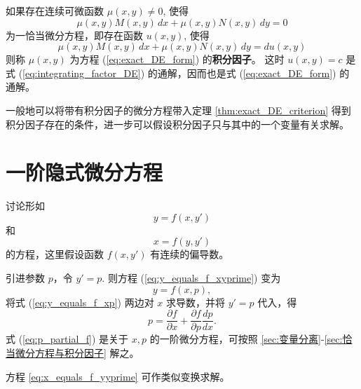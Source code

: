 \begin{definition}[积分因子]\label{def:积分因子}
    如果存在连续可微函数 $\mu(x,y) \ne 0$, 使得
\begin{equation}
\mu(x,y)M(x,y)\,dx+\mu(x,y)N(x,y)\,dy=0 \label{eq:integrating_factor_DE}
\end{equation}
为一恰当微分方程，即存在函数 $u(x,y)$, 使得
$$\mu(x,y)M(x,y)\,dx+\mu(x,y)N(x,y)\,dy=du(x,y)$$
则称 $\mu(x,y)$ 为方程 (\ref{eq:exact_DE_form}) 的\textbf{积分因子}。
这时 $u(x,y)=c$ 是式 (\ref{eq:integrating_factor_DE}) 的通解，因而也是式 (\ref{eq:exact_DE_form}) 的通解。
\end{definition}
\begin{remark}
    一般地可以将带有积分因子的微分方程带入定理 \ref{thm:exact_DE_criterion} 得到积分因子存在的条件，进一步可以假设积分因子只与其中的一个变量有关求解。
\end{remark}

\section{一阶隐式微分方程}\label{sec:一阶隐式微分方程}
\begin{example}
    讨论形如
\begin{equation}
y=f(x,y') \label{eq:y_equals_f_xyprime}
\end{equation}
和
\begin{equation}
x=f(y,y') \label{eq:x_equals_f_yyprime}
\end{equation}的方程，这里假设函数 $f(x,y')$ 有连续的偏导数。
\end{example}
\begin{solution}
    引进参数 $p$，令 $y'=p$. 则方程 (\ref{eq:y_equals_f_xyprime}) 变为
\begin{equation}
y=f(x,p), \label{eq:y_equals_f_xp}
\end{equation}
将式 (\ref{eq:y_equals_f_xp}) 两边对 $x$ 求导数，并将 $y'=p$ 代入，得
\begin{equation}
p = \frac{\partial f}{\partial x} + \frac{\partial f}{\partial p}\frac{dp}{dx}. \label{eq:p_partial_f}
\end{equation}
式 (\ref{eq:p_partial_f}) 是关于 $x,p$ 的一阶微分方程，可按照 \ref{sec:变量分离}-\ref{sec:恰当微分方程与积分因子} 解之。

方程 \eqref{eq:x_equals_f_yyprime} 可作类似变换求解。
\end{solution}

